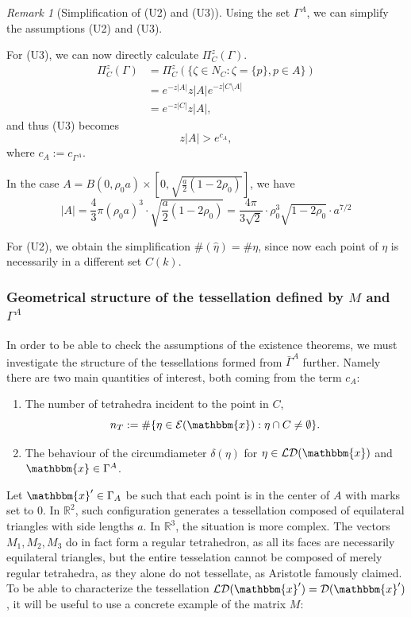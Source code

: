\documentclass[12pt,a4paper]{article}
\newcommand{\R}{{\mathbb R^3}}
\theoremstyle{definition}
\theoremstyle{remark}
\newtheorem{remark}{Remark}
\theoremstyle{theorem}
\newcommand{\x}{\mathbbm{x}}
\begin{document}
\begin{remark}[Simplification of (U2) and (U3)]\label{r:UA}
	Using the set $\Gamma^A$, we can simplify the assumptions (U2) and (U3).
	
	For (U3), we can now directly calculate $\Pi^z_C(\Gamma)$.
	\begin{align*} 
		\Pi^z_C(\Gamma) &= \Pi^z_C(\{\zeta \in N_C: \zeta = \{p\}, p \in A\}) \\
		& = e^{-z|A|} z |A| e^{-z|C\setminus A|} \\
		& = e^{-z|C|} z |A|,
	\end{align*}
	and thus (U3) becomes
	$$z|A| > e^{c_{A}},$$
	where $c_A := c_{\Gamma^A}$.

	In the case $A = B(0,\rho_0 a)\times [0, \sqrt{\frac a2(1-2\rho_0)}]$, we have
	$$|A| = \frac 43 \pi (\rho_0 a)^3 \cdot \sqrt{\frac a2(1-2\rho_0)} = \frac {4\pi}{3\sqrt{2}}\cdot  \rho_0^3 \sqrt{1-2\rho_0} \cdot a^{7/2}$$

	For (U2), we obtain the simplification $\#(\hat\eta) = \#\eta$, since now each point of $\eta$ is necessarily in a different set $C(k)$.
\end{remark}



\subsubsection{Geometrical structure of the tessellation defined by $M$ and $\Gamma^A$}
In order to be able to check the assumptions of the existence theorems, we must investigate the structure of the tessellations formed from $\bar\Gamma^A$ further. Namely there are two main quantities of interest, both coming from the term $c_A$:
\begin{enumerate}
	\item The number of tetrahedra incident to the point in $C$,  
		$$n_T := \# \{\eta \in \mathcal E(\x): \eta \cap C \neq \emptyset\}.$$
	\item The behaviour of the circumdiameter $\delta(\eta)$ for $\eta \in \mathcal {LD}(\x)$ and $\x \in \Gamma^A$.
\end{enumerate}

Let $\x' \in \Gamma_A$ be such that each point is in the center of $A$ with marks set to $0$. In $\mathbb R^2$, such configuration generates a tessellation composed of equilateral triangles with side lengths $a$. In $\R$, the situation is more complex. The vectors $M_1,M_2,M_3$ do in fact form a regular tetrahedron, as all its faces are necessarily equilateral triangles, but the entire tesselation cannot be composed of merely regular tetrahedra, as they alone do not tessellate, as Aristotle famously claimed\cite{Lagarias12}. To be able to characterize the tessellation $\mathcal {LD}(\x')=\mathcal D(\x')$, it will be useful to use a concrete example of the matrix $M$:
\end{document}
